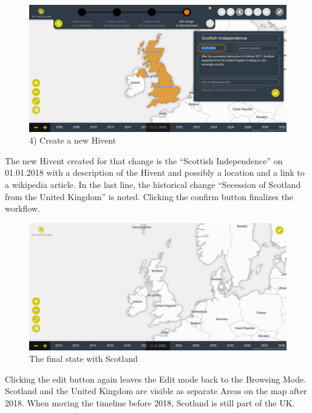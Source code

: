 \vspace{1em}
\begin{minipage}[t]{0.47\textwidth}

  \begin{figure}[H]
    \centering
    \includegraphics[width=1.0\textwidth]{graphics/development/user_interface_design_process/7_add_change_to_hivent_2.png}
    \caption{4) Create a new Hivent}
    \label{fig:final_7_add_change_to_hivent_2}
  \end{figure}

  The new Hivent created for that change is the ``Scottish Independence'' on 01.01.2018 with a description of the Hivent and possibly a location and a link to a wikipedia article. In the last line, the historical change ``Secession of Scotland from the United Kingdom'' is noted. Clicking the confirm button finalizes the workflow.

\end{minipage}    %
\hspace{1.5em}    %
\begin{minipage}[t]{0.47\textwidth}

  \begin{figure}[H]
    \centering
    \includegraphics[width=1.0\textwidth]{graphics/development/user_interface_design_process/8_final_state.png}
    \caption{The final state with Scotland}
    \label{fig:final_8_final_state}
  \end{figure}

  Clicking the edit button again leaves the Edit mode back to the Browsing Mode. Scotland and the United Kingdom are visible as separate Areas on the map after 2018. When moving the timeline before 2018, Scotland is still part of the UK.

\end{minipage}


